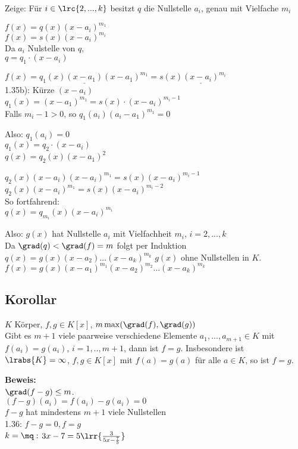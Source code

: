 	Zeige: Für $i\in\lrc{2,...,k}$ besitzt $q$ die Nullstelle $a_i$, genau mit Vielfache $m_i$
	
	$f(x)=q(x)(x-a_i)^{m_1}$\\
	$f(x)=s(x)(x-a_i)^{m_i}$\\
	Da $a_i$ Nulstelle von $q$,\\
	$q=q_1\cdot(x-a_i)$
	
	$f(x)=q_1(x)\underline{(x-a_1)}(x-a_1)^{m_1}=s(x)\underline{(x-a_i)}^{m_i}$\\
	1.35b): Kürze $(x-a_i)$\\
	$q_1(x)=(x-a_1)^{m_1}=s(x)\cdot(x-a_i)^{m_i-1}$\\
	Falls $m_i-1>0$, so $q_1(a_i)(a_i-a_1)^{m_1}=0$
	
	Also: $q_1(a_i)=0$\\
	$q_1(x)=q_2\cdot(x-a_i)$\\
	$q(x)=q_2(x)(x-a_1)^2$
	
	$q_2(x)(x-a_i)(x-a_i)^{m_1}=s(x)(x-a_i)^{m_i-1}$\\
	$q_2(x)(x-a_i)^{m_1}=s(x)(x-a_i)^{m_i-2}$\\
	So fortfahrend:\\
	$q(x)=q_{m_i}(x)(x-a_i)^{m_i}$
	
	Also: $g(x)$ hat Nullstelle $a_i$ mit Vielfachheit $m_i$, $i=2,...,k$\\
	Da $\grad(q)<\grad(f)=m$ folgt per Induktion $q(x)=g(x)(x-a_2)\dots(x-a_k)^{m_k}$ $g(x)$ ohne Nullstellen in $K$.\\
	$f(x)=g(x)(x-a_1)^{m_1}(x-a_2)^{m_2}\dots(x-a_k)^{m_k}$
	
	\subsection{Korollar}
	
	$K$ Körper, $f,g\in K[x]$, $m\max(\grad(f),\grad(g))$\\
	Gibt es $m+1$ viele paarweise verschiedene Elemente $a_1,...,a_{m+1}\in K$ mit $f(a_i)=g(a_i)$, $i=1,..,m+1$, dann ist $f=g$. Insbesondere ist $\lrabs{K}=\infty$, $f,g\in K[x]$ mit $f(a)=g(a)$ für alle $a\in K$, so ist $f=g$.
	
	\textbf{Beweis:}\\
	$\grad(f-g)\leq m$.\\
	$(f-g)(a_i)=f(a_i)-g(a_i)=0$\\
	$f-g$ hat mindestens $m+1$ viele Nullstellen\\
	1.36: $f-g=0,f=g$\\
	$k=\mq:$ $3x-7=5\lrr{\frac{3}{5x-\frac{7}{5}}}$
	
